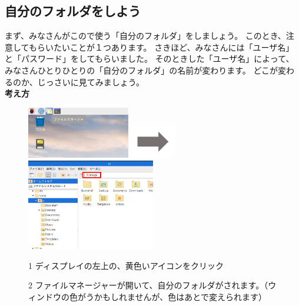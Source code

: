 \documentclass[a4paper,12pt]{jarticle}
\begin{document}
\clearpage

\subsection{\theExercise 自分のフォルダをしよう}
まず、みなさんがこので使う「自分のフォルダ」をしましょう。
このとき、注意してもらいたいことが１つあります。
さきほど、みなさんには「ユーザ名」と「パスワード」をしてもらいました。
そのときした「ユーザ名」によって、みなさんひとりひとりの「自分のフォルダ」の名前が変わります。
どこが変わるのか、じっさいに見てみましょう。\\

{\bf \large 考え方}\\
\begin{figure}[ht]
\begin{minipage}{\textwidth}
  \includegraphics[width=0.4\textwidth]{textbook-img032.png}
  \includegraphics[width=2cm]{textbook-img035.png}
  \includegraphics[width=0.5\textwidth]{textbook-img1020.png}
\end{minipage}
\begin{minipage}{0.4\textwidth}
  1
  ディスプレイの左上の、黄色いアイコンをクリック
\end{minipage}
\hspace{2cm}
\vspace{20pt}
\begin{minipage}{0.5\textwidth}
  \vspace{20pt}
  2
  ファイルマネージャーが開いて、自分のフォルダがされます。（ウィンドウの色がうかもしれませんが、色はあとで変えられます）
\end{minipage}
\end{figure}
\end{document}

